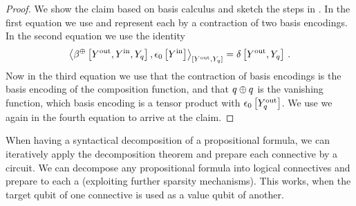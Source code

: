 \begin{proof}
    We show the claim based on basis calculus and sketch the steps in .
    In the first equation we use  and represent each \computationCircuit{} by a contraction of two basis encodings.
    In the second equation we use the identity
    \begin{align*}
        \contractionof{\bencodingofat{\oplus}{\cheadvariable{\outsymbol},\cheadvariable{\insymbol},\headvariableof{\exfunction}},
            \fbasisat{\cheadvariable{\insymbol}}}{\cheadvariable{\outsymbol},\headvariableof{\exfunction}}
        = \identityat{\cheadvariable{\outsymbol},\headvariableof{\exfunction}} \, .
    \end{align*}
    Now in the third equation we use that the contraction of basis encodings is the basis encoding of the composition function, and that $q\oplus q$ is the vanishing function, which basis encoding is a tensor product with $\epsilon_{0}\left[Y_{q}^{\mathrm{out}}\right]$.
    We use we  again in the fourth equation to arrive at the claim.
\end{proof}

When having a syntactical decomposition of a propositional formula, we can iteratively apply the \computationCircuit{} decomposition theorem and prepare each connective by a circuit.
We can decompose any propositional formula into logical connectives and prepare to each a \computationCircuit{} (exploiting further sparsity mechanisms).
This works, when the target qubit of one connective is used as a value qubit of another.

